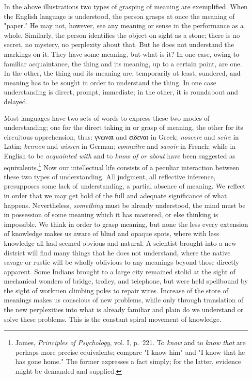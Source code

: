 \documentclass[letterpaper]{book}
\begin{document}


In the above illustrations two types of grasping of meaning are
exemplified. When the English language is understood, the person grasps
at once the meaning of "paper." He may not, however, see any meaning or
sense in the performance as a whole. Similarly, the person identifies
the object on sight as a stone; there is no secret, no mystery, no
perplexity about that. But he does not understand the markings on it.
They
have
some meaning, but what is it? In one case, owing to familiar
acquaintance, the thing and its meaning, up to a certain point, are one.
In the other, the thing and its meaning are, temporarily at least,
sundered, and meaning has to be sought in order to understand the thing.
In one case understanding is direct, prompt, immediate; in the other, it
is roundabout and delayed.


Most languages have two sets of words to express these two modes of
understanding; one for the direct taking in or grasp of meaning, the
other for its circuitous apprehension, thus: \textgreek{γνωναι} and
\textgreek{ειδεναι} in Greek; \emph{noscere} and \emph{scire} in Latin;
\emph{kennen} and \emph{wissen} in German; \emph{connaître} and
\emph{savoir} in French; while in English to be \emph{acquainted with}
and to \emph{know of or about} have been suggested as
equivalents.\footnote{
James, \emph{Principles of Psychology}, vol. I, p.\ 221. To \emph{know}
and to \emph{know that} are perhaps more precise equivalents; compare "I
know him" and "I know that he has gone home." The former expresses a
fact simply; for the latter, evidence might be demanded and supplied.
}
Now our intellectual life consists of a peculiar interaction between
these two types of understanding. All judgment, all reflective
inference, presupposes some lack of understanding, a partial absence of
meaning. We reflect in order that we may get hold of the full and
adequate significance of what happens. Nevertheless, \emph{something}
must be already understood, the mind must be in possession of some
meaning which it has mastered, or else thinking is impossible. We think
in order to grasp meaning, but none the less every extension of
knowledge makes us aware of blind and opaque spots, where with less
knowledge all had seemed obvious and natural. A scientist brought into a
new district will find many things that he does not understand, where
the native savage
or
rustic will be wholly oblivious to any meanings beyond those directly
apparent. Some Indians brought to a large city remained stolid at the
sight of mechanical wonders of bridge, trolley, and telephone, but were
held spellbound by the sight of workmen climbing poles to repair wires.
Increase of the store of meanings makes us conscious of new problems,
while only through translation of the new perplexities into what is
already familiar and plain do we understand or solve these problems.
This is the constant spiral movement of knowledge.
\end{document}
